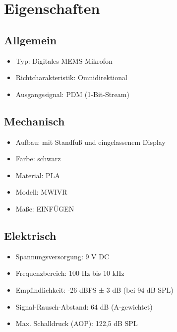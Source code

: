 \chapter{Eigenschaften} \label{sec:Eigenschaften}

\section{Allgemein}

\begin{itemize}
    \item Typ: Digitales MEMS-Mikrofon
    
    \item Richtcharakteristik: Omnidirektional
    
    \item Ausgangssignal: PDM (1-Bit-Stream)
\end{itemize}

\section{Mechanisch}

\begin{itemize}
    \item Aufbau: mit Standfuß und eingelassenem Display
    
    \item Farbe: schwarz
    
    \item Material: PLA
    
    \item Modell: MWIVR
    
    \item Maße: EINFÜGEN
\end{itemize}

\section{Elektrisch}

\begin{itemize}
    \item Spannungsversorgung: 9 V DC
    
    \item Frequenzbereich: 100 Hz bis 10 kHz 
    
    \item Empfindlichkeit: -26 dBFS ± 3 dB (bei 94 dB SPL)  
    
    \item Signal-Rausch-Abstand: 64 dB (A-gewichtet) 
    
    \item Max. Schalldruck (AOP): 122,5 dB SPL
\end{itemize}

